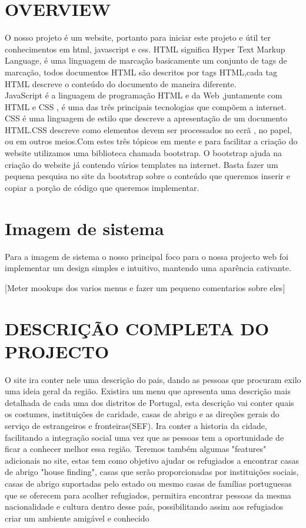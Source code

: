 \documentclass{article}
\begin{document}
\section{OVERVIEW}
O nosso projeto é um website, portanto para iniciar este
projeto e útil ter conhecimentos em html, javascript e css.
HTML significa Hyper Text Markup Language, é uma linguagem de marcação basicamente um conjunto de tags de marcação, todos documentos HTML são descritos por tags HTML,cada tag HTML descreve o conteúdo do documento de maneira diferente.\\
JavaScript é a linguagem de programação HTML e da Web ,juntamente com HTML e CSS , é uma das três principais tecnologias que compõem a internet.
CSS é uma linguagem de estilo que descreve a apresentação de um documento HTML.CSS descreve como elementos devem ser processados no ecrã , no papel, ou em outros meios.Com estes três tópicos em mente e para facilitar a criação do website utilizamos uma biblioteca chamada bootstrap.
O bootstrap ajuda na criação do website já contendo vários
templates na internet. Basta fazer um pequena pesquisa no site da bootstrap sobre o conteúdo que queremos inserir e copiar a porção de código que queremos implementar. 

\section{Imagem de sistema}
Para a imagem de sistema o nosso principal foco para o nossa projecto web foi implementar um design simples e intuitivo, mantendo uma aparência cativante.

[Meter mookups dos varios menus e fazer um pequeno comentarios sobre eles]



\section{DESCRIÇÃO COMPLETA DO PROJECTO}
O site ira conter nele uma descrição do pais, dando as
pessoas que procuram exilo uma ideia geral da região. Existira um menu que apresenta uma descrição mais detalhada
de cada uma dos distritos de Portugal, esta descrição
vai conter quais os costumes, instituições de caridade, casas
de abrigo e as direções gerais do serviço de estrangeiros e
fronteiras(SEF). Ira conter a historia da cidade, facilitando
a integração social uma vez que as pessoas tem a oportunidade
de ficar a conhecer melhor essa região.
Teremos também algumas "features" adicionais no site, estas
tem como objetivo ajudar os refugiados a encontrar casas
de abrigo "house finding", casas que serão proporcionadas
por instituições sociais, casas de abrigo suportadas pelo estado
ou mesmo casas de famílias portuguesas que se oferecem
para acolher refugiados, permitira encontrar pessoas da
mesma nacionalidade e cultura dentro desse país, possibilitando
assim aos refugiados criar um ambiente amigável e conhecido
\end{document}
